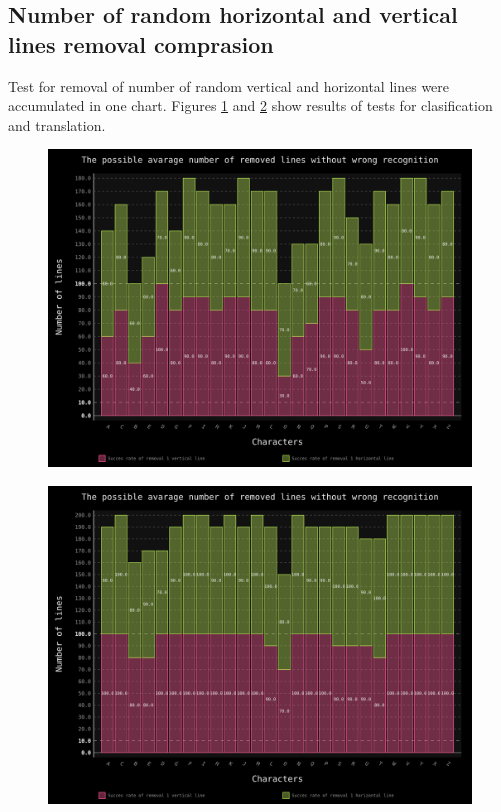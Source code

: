 \documentclass[a4paper]{article}
\begin{document}
\clearpage
\subsection{Number of random horizontal and vertical lines removal comprasion}
Test for removal of number of random vertical and horizontal lines were accumulated in one chart.
Figures \ref{lines_trans} and \ref{lines_clas} show results of tests for clasification and translation. 
\begin{figure}[ht]
	\centering
	\includegraphics[scale=0.7,keepaspectratio=true]{Charts/Removed_linesTestPlanResultsChart_NormalTester.png}	
	\caption{}
	\label{lines_trans}
\end{figure}

\begin{figure}[t]
	\centering
	\includegraphics[scale=0.7,keepaspectratio=true]{Charts/Removed_linesTestPlanResultsChart_ClasifierTester.png}	
	\caption{}
	\label{lines_clas}
\end{figure}
\end{document}
